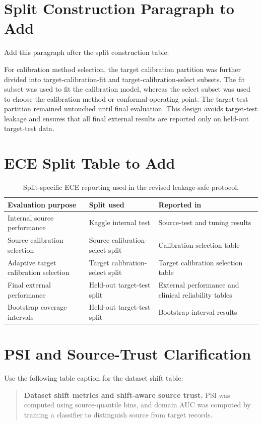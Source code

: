 \documentclass[11pt]{article}
\begin{document}
\section{Split Construction Paragraph to Add}
Add this paragraph after the split construction table:

For calibration method selection, the target calibration partition was further divided into target-calibration-fit and target-calibration-select subsets. The fit subset was used to fit the calibration model, whereas the select subset was used to choose the calibration method or conformal operating point. The target-test partition remained untouched until final evaluation. This design avoids target-test leakage and ensures that all final external results are reported only on held-out target-test data.

\section{ECE Split Table to Add}
\begin{table}[!t]
\centering
\caption{Split-specific ECE reporting used in the revised leakage-safe protocol.}
\label{tab:ece_splits}
\begin{tabular}{lll}
\toprule
Evaluation purpose & Split used & Reported in \\
\midrule
Internal source performance & Kaggle internal test & Source-test and tuning results \\
Source calibration selection & Source calibration-select split & Calibration selection table \\
Adaptive target calibration selection & Target calibration-select split & Target calibration selection table \\
Final external performance & Held-out target-test split & External performance and clinical reliability tables \\
Bootstrap coverage intervals & Held-out target-test split & Bootstrap interval results \\
\bottomrule
\end{tabular}
\end{table}

\section{PSI and Source-Trust Clarification}
Use the following table caption for the dataset shift table:

\begin{quote}
\textbf{Dataset shift metrics and shift-aware source trust.} PSI was computed using source-quantile bins, and domain AUC was computed by training a classifier to distinguish source from target records.
\end{quote}
\end{document}
